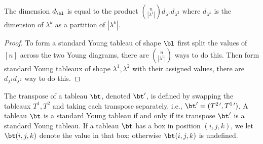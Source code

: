 \documentclass[11pt]{report}
\begin{document}
\begin{lemma}
	The dimension $d_{\bl}$ is equal to the product ${n\choose |\lambda^{1}|} d_{\lambda^{1}}d_{\lambda^{2}}$ where $d_{\lambda^{k}}$ is the dimension of $\lambda^{k}$ as a partition of $|\lambda^{k}|$.
\end{lemma} 
\begin{proof}
	To form a standard Young tableau of shape $\bl$ first split the values of $[n]$ across the two Young diagrams, there are ${n \choose |\lambda^{1}|}$ ways to do this. Then form standard Young tableaux of shape $\lambda^{1}, \lambda^{2}$ with their assigned values, there are $d_{\lambda^{1}}d_{\lambda^{2}}$ way to do this.
\end{proof}

The transpose of a tableau $\bt$, denoted $\bt^{\prime}$, is defined by swapping the tableaux $T^{1},T^{2}$ and taking each transpose separately, i.e., $\bt^{\prime}= (T^{2 \, \prime}, T^{1 \, \prime})$. A tableau $\bt$  is a standard Young tableau if and only if its transpose $\bt^{\prime}$ is a standard Young tableau. If a tableau $\bt$ has a box in position $(i,j,k)$, we let $\bt(i,j,k)$ denote the value in that box; otherwise $\bt(i,j,k)$ is undefined. 
\end{document}
